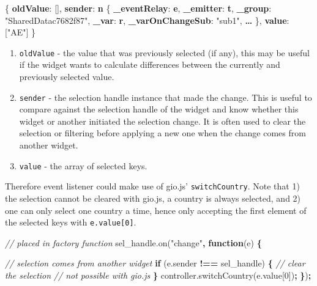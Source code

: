 \documentclass[10pt,]{krantz}
\makeatletter
\newenvironment{Shaded}{\begin{snugshade}}{\end{snugshade}}
\newcommand{\AttributeTok}[1]{\textcolor[rgb]{0.61,0.61,0.61}{#1}}
\newcommand{\CommentTok}[1]{\textcolor[rgb]{0.37,0.37,0.37}{\textit{#1}}}
\newcommand{\ControlFlowTok}[1]{\textcolor[rgb]{0.27,0.27,0.27}{\textbf{#1}}}
\newcommand{\DecValTok}[1]{\textcolor[rgb]{0.06,0.06,0.06}{#1}}
\newcommand{\ErrorTok}[1]{\textcolor[rgb]{0.14,0.14,0.14}{\textbf{#1}}}
\newcommand{\FunctionTok}[1]{\textcolor[rgb]{0,0,0}{#1}}
\newcommand{\KeywordTok}[1]{\textcolor[rgb]{0.27,0.27,0.27}{\textbf{#1}}}
\newcommand{\NormalTok}[1]{#1}
\newcommand{\OperatorTok}[1]{\textcolor[rgb]{0.43,0.43,0.43}{\textbf{#1}}}
\newcommand{\OtherTok}[1]{\textcolor[rgb]{0.37,0.37,0.37}{#1}}
\newcommand{\StringTok}[1]{\textcolor[rgb]{0.5,0.5,0.5}{#1}}
\newcommand{\VariableTok}[1]{\textcolor[rgb]{0,0,0}{#1}}
\providecommand{\tightlist}{%
  \setlength{\itemsep}{0pt}\setlength{\parskip}{0pt}}
\newenvironment{kframe}{%
\medskip{}
\setlength{\fboxsep}{.8em}
 \def\at@end@of@kframe{}%
 \ifinner\ifhmode%
  \def\at@end@of@kframe{\end{minipage}}%
  \begin{minipage}{\columnwidth}%
 \fi\fi%
 \def\FrameCommand##1{\hskip\@totalleftmargin \hskip-\fboxsep
 \colorbox{shadecolor}{##1}\hskip-\fboxsep
     \hskip-\linewidth \hskip-\@totalleftmargin \hskip\columnwidth}%
 \MakeFramed {\advance\hsize-\width
   \@totalleftmargin\z@ \linewidth\hsize
   \@setminipage}}%
 {\par\unskip\endMakeFramed%
 \at@end@of@kframe}
\renewenvironment{Shaded}{\begin{kframe}}{\end{kframe}}
\makeatother
\begin{document}
\begin{Shaded}
\begin{Highlighting}[]
\FunctionTok{\{}
  \ErrorTok{oldValue}\FunctionTok{:} \OtherTok{[]}\FunctionTok{,}
  \ErrorTok{sender}\FunctionTok{:} \ErrorTok{n} \FunctionTok{\{}
    \ErrorTok{_eventRelay}\FunctionTok{:} \ErrorTok{e}\FunctionTok{,} 
    \ErrorTok{_emitter}\FunctionTok{:} \ErrorTok{t}\FunctionTok{,} 
    \ErrorTok{_group}\FunctionTok{:} \StringTok{"SharedDatac7682f87"}\FunctionTok{,} 
    \ErrorTok{_var}\FunctionTok{:} \ErrorTok{r}\FunctionTok{,} 
    \ErrorTok{_varOnChangeSub}\FunctionTok{:} \StringTok{"sub1"}\FunctionTok{,} 
    \ErrorTok{…}
  \FunctionTok{\},}
  \ErrorTok{value}\FunctionTok{:} \OtherTok{[}\StringTok{"AE"}\OtherTok{]}
\FunctionTok{\}}
\end{Highlighting}
\end{Shaded}

\begin{enumerate}
\def\labelenumi{\arabic{enumi}.}
\tightlist
\item
  \texttt{oldValue} - the value that was previously selected (if any), this may be useful if the widget wants to calculate differences between the currently and previously selected value.
\item
  \texttt{sender} - the selection handle instance that made the change. This is useful to compare against the selection handle of the widget and know whether this widget or another initiated the selection change. It is often used to clear the selection or filtering before applying a new one when the change comes from another widget.
\item
  \texttt{value} - the array of selected keys.
\end{enumerate}

Therefore event listener could make use of gio.js' \texttt{switchCountry}. Note that 1) the selection cannot be cleared with gio.js, a country is always selected, and 2) one can only select one country a time, hence only accepting the first element of the selected keys with \texttt{e.value{[}0{]}}.

\begin{Shaded}
\begin{Highlighting}[]
\CommentTok{// placed in factory function}
\VariableTok{sel_handle}\NormalTok{.}\AttributeTok{on}\NormalTok{(}\StringTok{"change"}\OperatorTok{,} \KeywordTok{function}\NormalTok{(e) }\OperatorTok{\{}

  \CommentTok{// selection comes from another widget}
  \ControlFlowTok{if}\NormalTok{ (}\VariableTok{e}\NormalTok{.}\AttributeTok{sender} \OperatorTok{!==}\NormalTok{ sel_handle) }\OperatorTok{\{}
    \CommentTok{// clear the selection}
    \CommentTok{// not possible with gio.js}
  \OperatorTok{\}}
  \VariableTok{controller}\NormalTok{.}\AttributeTok{switchCountry}\NormalTok{(}\VariableTok{e}\NormalTok{.}\AttributeTok{value}\NormalTok{[}\DecValTok{0}\NormalTok{])}\OperatorTok{;}
\OperatorTok{\}}\NormalTok{)}\OperatorTok{;}
\end{Highlighting}
\end{Shaded}
\end{document}
